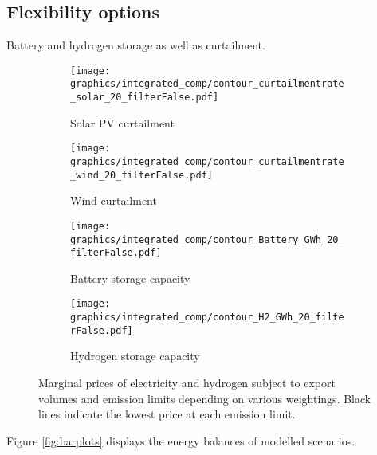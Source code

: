 \subsection{Flexibility options}
Battery and hydrogen storage as well as curtailment.

\begin{figure*}[t] %
    \centering
    \begin{subfigure}[b]{0.45\linewidth}
        \centering
        \texttt{[image: graphics/integrated\_comp/contour\_curtailmentrate\_solar\_20\_filterFalse.pdf]}
        \caption{Solar PV curtailment}
        \label{fig:solar_curt}
    \end{subfigure}
    \hfill
    \begin{subfigure}[b]{0.45\linewidth}
        \centering
        \texttt{[image: graphics/integrated\_comp/contour\_curtailmentrate\_wind\_20\_filterFalse.pdf]}
        \caption{Wind curtailment}
        \label{fig:wind_curt}
    \end{subfigure}
    \hfill
    \begin{subfigure}[b]{0.45\linewidth}
        \centering
        \texttt{[image: graphics/integrated\_comp/contour\_Battery\_GWh\_20\_filterFalse.pdf]}
        \caption{Battery storage capacity}
        \label{fig:battery_cap}
    \end{subfigure}
    \hfill
    \begin{subfigure}[b]{0.45\linewidth}
        \centering
        \texttt{[image: graphics/integrated\_comp/contour\_H2\_GWh\_20\_filterFalse.pdf]}
        \caption{Hydrogen storage capacity}
        \label{fig:hystorage_cap}
    \end{subfigure}
    \hfill

    \caption{Marginal prices of electricity and hydrogen subject to export volumes and emission limits depending on various weightings. Black lines indicate the lowest price at each emission limit.}
    \label{fig:integration_options}
\end{figure*}

Figure \ref{fig:barplots} displays the energy balances of modelled scenarios.


